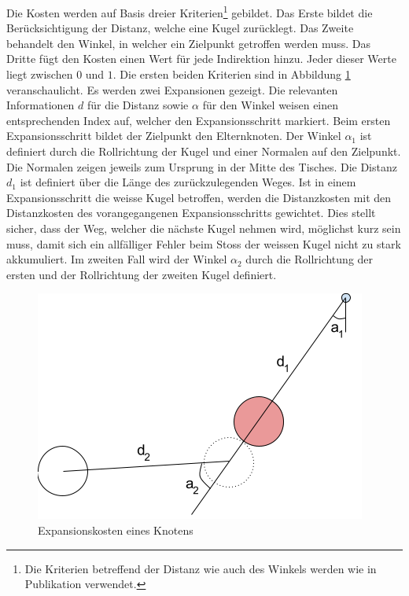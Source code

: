 Die Kosten werden auf Basis dreier Kriterien\footnote{Die Kriterien betreffend der Distanz wie auch des Winkels werden wie
in Publikation \cite{inproceedings:billiard_ai:1} verwendet.} gebildet. Das Erste bildet die Berücksichtigung der Distanz, welche eine
Kugel zurücklegt. Das Zweite behandelt den Winkel, in welcher ein Zielpunkt getroffen werden muss. Das Dritte fügt den
Kosten einen Wert für jede Indirektion hinzu. Jeder dieser Werte liegt zwischen $0$ und $1$.
Die ersten beiden Kriterien sind in Abbildung \ref{fig:suche_knoten_expansionskosten} veranschaulicht.
Es werden zwei Expansionen gezeigt. Die relevanten Informationen $d$ für die Distanz sowie $\alpha$ für den Winkel weisen
einen entsprechenden Index auf, welcher den Expansionsschritt markiert. Beim ersten Expansionsschritt bildet der Zielpunkt
den Elternknoten. Der Winkel $\alpha_1$ ist definiert durch die Rollrichtung der Kugel und einer Normalen auf den Zielpunkt.
Die Normalen zeigen jeweils zum Ursprung in der Mitte des Tisches. Die Distanz $d_1$ ist definiert über die Länge des
zurückzulegenden Weges. Ist in einem Expansionsschritt die weisse Kugel betroffen, werden die Distanzkosten mit den
Distanzkosten des vorangegangenen Expansionsschritts gewichtet. Dies stellt sicher, dass der Weg, welcher die nächste
Kugel nehmen wird, möglichst kurz sein muss, damit sich ein allfälliger Fehler beim Stoss der weissen Kugel nicht zu
stark akkumuliert. Im zweiten Fall wird der Winkel $\alpha_2$ durch die Rollrichtung der ersten und der Rollrichtung
der zweiten Kugel definiert.

\begin{figure}[h!]
    \begin{center}
        \includegraphics[width=0.5\linewidth]{../common/03_billiard_ai/resources/29_suchbaum_expansionskosten.png}
    \end{center}
    \caption{Expansionskosten eines Knotens}
    \label{fig:suche_knoten_expansionskosten}
\end{figure}

